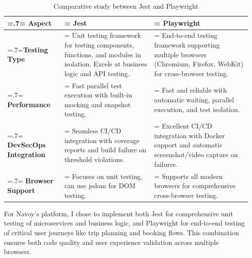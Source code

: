 \begin{table}[H]
    \renewcommand{\arraystretch}{1.5}
    \caption{Comparative study between Jest and Playwright}
    \centering
    \medskip
    \begin{tabularx}{1\textwidth} {
            | >{\hsize=.7\hsize\linewidth=\hsize\centering\arraybackslash}X
            | >{\hsize=1.15\hsize\linewidth=\hsize\justifying\arraybackslash}X
            | >{\hsize=1.15\hsize\linewidth=\hsize\justifying\arraybackslash}X |}
        \hline
        \rowcolor{primary} \textbf {Aspect} & \textbf {Jest}                                                                                                                          & \textbf {Playwright}                                                                                                       \\
        \hline
        \textbf {Testing Type}              & \noindent Unit testing framework for testing components, functions, and modules in isolation. Excels at business logic and API testing. & \noindent End-to-end testing framework supporting multiple browsers (Chromium, Firefox, WebKit) for cross-browser testing. \\
        \hline
        \textbf {Performance}               & \noindent Fast parallel test execution with built-in mocking and snapshot testing.                                                      & \noindent Fast and reliable with automatic waiting, parallel execution, and test isolation.                                \\
        \hline
        \textbf {DevSecOps Integration}     & \noindent Seamless CI/CD integration with coverage reports and build failure on threshold violations.                                   & \noindent Excellent CI/CD integration with Docker support and automatic screenshot/video capture on failures.              \\
        \hline
        \textbf {Browser Support}           & \noindent Focuses on unit testing, can use jsdom for DOM testing.                                                                       & \noindent Supports all modern browsers for comprehensive cross-browser testing.                                            \\
        \hline
    \end{tabularx}
\end{table}

For Navoy's platform, I chose to implement both Jest for comprehensive unit testing of microservices and business logic, and Playwright for end-to-end testing of critical user journeys like trip planning and booking flows. This combination ensures both code quality and user experience validation across multiple browsers.

